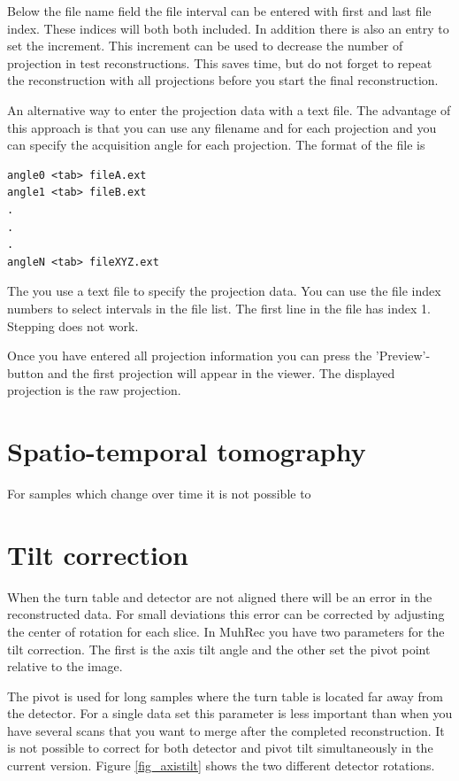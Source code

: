 \documentclass[a4paper]{scrreprt}
\begin{document}
Below the file name field the file interval can be entered with first and last
file index. These indices will both both included. In addition there is also an
entry to set the increment. This increment can be used to decrease the number of
projection in test reconstructions. This saves time, but do not forget to repeat
the reconstruction with all projections before you start the final
reconstruction.

An alternative way to enter the projection data with a text file. The advantage
of this approach is that you can use any filename and for each projection and
you can specify the acquisition angle for each projection.
The format of the file is
\begin{verbatim}
angle0 <tab> fileA.ext
angle1 <tab> fileB.ext
.
.
.
angleN <tab> fileXYZ.ext
\end{verbatim}
The you use a text file to specify the projection data. You can use the file
index numbers to select intervals in the file list. The first line in the file
has index 1. Stepping does not work.


Once you have entered all projection information you can press the
'Preview'-button and the first projection will appear in the viewer. The
displayed projection is the raw projection.

\section{Spatio-temporal tomography}
For samples which change over time it is not possible to 


\section{Tilt correction}
When the turn table and detector are not aligned there will be an error in the
reconstructed data. For small deviations this error can be corrected by
adjusting the center of rotation for each slice. In MuhRec you have two
parameters for the tilt correction. The first is the axis tilt angle and the
other set the pivot point relative to the image.


The pivot is used for long samples where the turn table is located far away from
the detector. For a single data set this parameter is less important than when
you have several scans that you want to merge after the completed
reconstruction. It is not possible to correct for both detector and pivot tilt
simultaneously in the current version. Figure \ref{fig_axistilt} shows the two
different detector rotations.
\end{document}
